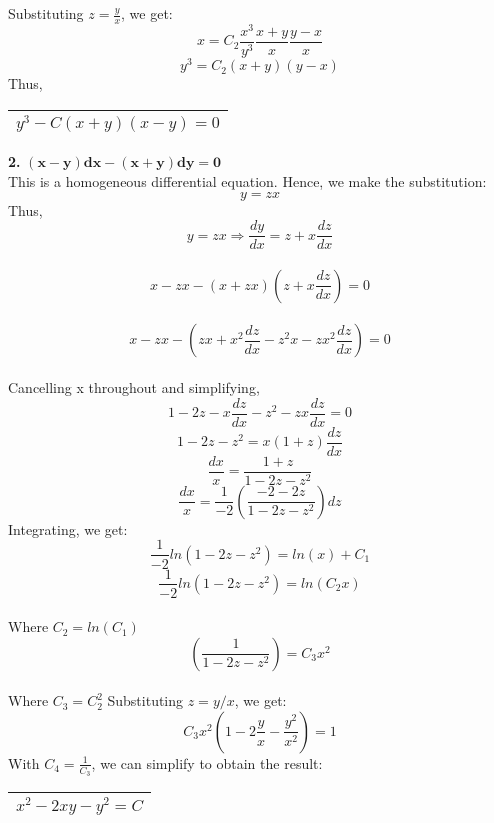 \documentclass{article}
\begin{document}
Substituting $z=\frac{y}{x}$, we get:\\
\[x=C_2\frac{x^3}{y^3}\frac{x+y}{x}\frac{y-x}{x}\]
\[y^3=C_2(x+y)(y-x)\]
Thus,\\
\begin{center}
\begin{tabular}{|c|}
\hline
$y^3-C(x+y)(x-y)=0$\\
\hline
\end{tabular}
\end{center}
\textbf{2. }$\mathbf{(x-y)dx - (x+y)dy = 0}$\\
This is a homogeneous differential equation. Hence, we make the substitution:
\[y=zx\]
Thus,\\
\[y=zx \Rightarrow \frac{dy}{dx} = z + x \frac{dz}{dx}\]\\
\[x-zx-(x+zx)\left(z+x\frac{dz}{dx}\right)=0\]\\
\[x-zx-\left(zx+x^2\frac{dz}{dx}-z^2x-zx^2\frac{dz}{dx}\right)=0\]\\
Cancelling x throughout and simplifying,\\
\[1-2z-x\frac{dz}{dx}-z^2-zx\frac{dz}{dx}=0\]
\[1-2z-z^2=x(1+z)\frac{dz}{dx}\]
\[\frac{dx}{x}=\frac{1+z}{1-2z-z^2}\]
\[\frac{dx}{x}=\frac{1}{-2}\left(\frac{-2-2z}{1-2z-z^2}\right)dz\]
Integrating, we get:\\
\[\frac{1}{-2}ln(1-2z-z^2)=ln(x)+C_1\]
\[\frac{1}{-2}ln(1-2z-z^2)=ln(C_2x) \]\\Where $C_2 = ln(C_1)$
\[\left(\frac{1}{1-2z-z^2}\right)=C_3x^2 \]\\Where $C_3 = C_2^2$
Substituting $z=y/x$, we get:\\
\[C_3x^2\left(1-2\frac{y}{x}-\frac{y^2}{x^2}\right)=1\]
With $C_4=\frac{1}{C_3}$, we can simplify to obtain the result:\\
\begin{center}
\begin{tabular}{|c|}
\hline
$x^2-2xy-y^2=C$\\
\hline
\end{tabular}
\end{center}
\end{document}
